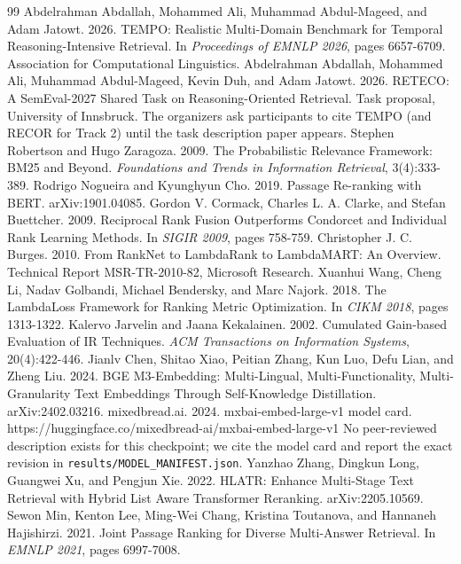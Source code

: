 \documentclass[11pt]{article}
\begin{document}
\begin{thebibliography}{99}
\small
{} Abdelrahman Abdallah, Mohammed Ali, Muhammad Abdul-Mageed, and Adam Jatowt. 2026. TEMPO: Realistic Multi-Domain Benchmark for Temporal Reasoning-Intensive Retrieval. In \emph{Proceedings of EMNLP 2026}, pages 6657-6709. Association for Computational Linguistics.
 Abdelrahman Abdallah, Mohammed Ali, Muhammad Abdul-Mageed, Kevin Duh, and Adam Jatowt. 2026. RETECO: A SemEval-2027 Shared Task on Reasoning-Oriented Retrieval. Task proposal, University of Innsbruck. The organizers ask participants to cite TEMPO (and RECOR for Track 2) until the task description paper appears.
 Stephen Robertson and Hugo Zaragoza. 2009. The Probabilistic Relevance Framework: BM25 and Beyond. \emph{Foundations and Trends in Information Retrieval}, 3(4):333-389.
 Rodrigo Nogueira and Kyunghyun Cho. 2019. Passage Re-ranking with BERT. arXiv:1901.04085.
 Gordon V. Cormack, Charles L. A. Clarke, and Stefan Buettcher. 2009. Reciprocal Rank Fusion Outperforms Condorcet and Individual Rank Learning Methods. In \emph{SIGIR 2009}, pages 758-759.
 Christopher J. C. Burges. 2010. From RankNet to LambdaRank to LambdaMART: An Overview. Technical Report MSR-TR-2010-82, Microsoft Research.
 Xuanhui Wang, Cheng Li, Nadav Golbandi, Michael Bendersky, and Marc Najork. 2018. The LambdaLoss Framework for Ranking Metric Optimization. In \emph{CIKM 2018}, pages 1313-1322.
 Kalervo Jarvelin and Jaana Kekalainen. 2002. Cumulated Gain-based Evaluation of IR Techniques. \emph{ACM Transactions on Information Systems}, 20(4):422-446.
 Jianlv Chen, Shitao Xiao, Peitian Zhang, Kun Luo, Defu Lian, and Zheng Liu. 2024. BGE M3-Embedding: Multi-Lingual, Multi-Functionality, Multi-Granularity Text Embeddings Through Self-Knowledge Distillation. arXiv:2402.03216.
 mixedbread.ai. 2024. mxbai-embed-large-v1 model card. https://huggingface.co/mixedbread-ai/mxbai-embed-large-v1 No peer-reviewed description exists for this checkpoint; we cite the model card and report the exact revision in \texttt{results/MODEL\_MANIFEST.json}.
 Yanzhao Zhang, Dingkun Long, Guangwei Xu, and Pengjun Xie. 2022. HLATR: Enhance Multi-Stage Text Retrieval with Hybrid List Aware Transformer Reranking. arXiv:2205.10569.
 Sewon Min, Kenton Lee, Ming-Wei Chang, Kristina Toutanova, and Hannaneh Hajishirzi. 2021. Joint Passage Ranking for Diverse Multi-Answer Retrieval. In \emph{EMNLP 2021}, pages 6997-7008.
\end{thebibliography}
\end{document}
